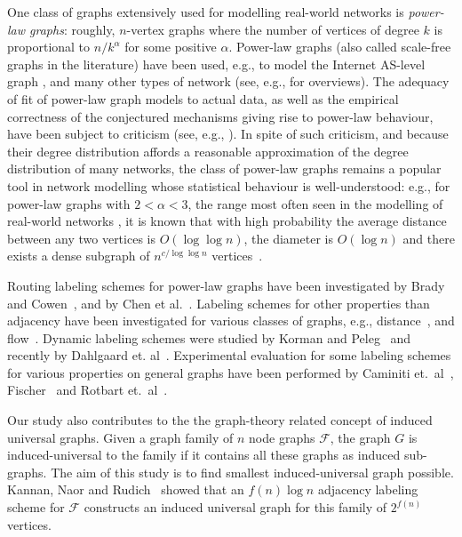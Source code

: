 One class of graphs extensively used for modelling real-world networks is \emph{power-law graphs}: roughly, $n$-vertex graphs where the number of vertices of degree $k$ is proportional to $n/k^{\alpha}$ for some positive $\alpha$. Power-law graphs (also called scale-free graphs in the literature) have been used, e.g., to model the Internet AS-level graph \cite{DBLP:journals/ton/SiganosFFF03,DBLP:conf/podc/AkellaCKS03}, and many other types of network (see, e.g., \cite{mitzenmacher2004brief,clauset2009power} for overviews). 
The adequacy of fit of power-law graph models to actual data, as well as the empirical correctness of the conjectured mechanisms giving rise to power-law behaviour, have been subject to criticism (see, e.g., \cite{DBLP:journals/jacm/AchlioptasCKM09,clauset2009power}). 
In spite of such criticism, and because their degree distribution affords a reasonable approximation of the degree distribution of many networks, the class of power-law graphs remains a popular tool in network modelling whose statistical behaviour is well-understood: e.g., for power-law graphs with $2<\alpha<3$, the range most often seen in the modelling of real-world networks \cite{clauset2009power}, it is known that with high probability the average distance between any two vertices is  $O(\log \log n)$, the diameter is $O(\log n)$ and there exists a dense subgraph of $n^{c/\log \log n}$ vertices~\cite{chung2004average}. 

Routing labeling schemes for power-law graphs  have been investigated by Brady and Cowen~\cite{brady2006compact}, and by Chen et al.~\cite{chen2012compact}. Labeling schemes for other properties than adjacency have been investigated for various classes of graphs, e.g., distance~\cite{gavoillea2004distance}, and flow~\cite{katz2004labeling}. 
Dynamic labeling schemes were studied by Korman and Peleg~\cite{korman2007compact,Korman07,korman2007general} and recently by Dahlgaard et. al~\cite{dahlgaard2014dynamic}.
Experimental evaluation for some labeling schemes for various properties on general graphs have been performed by Caminiti et.~al~\cite{caminiti2008engineering}, Fischer~\cite{fischer2009short} and Rotbart et.~al~\cite{rotbart2014evaluation}.

Our study also contributes to the   the graph-theory related concept of induced universal graphs. 
Given a  graph family of $n$ node graphs  $\mathcal{F}$, the graph $G$ is  induced-universal to the family if it contains all these graphs as induced sub-graphs.
The aim of this study is  to find smallest induced-universal graph possible.
Kannan, Naor and Rudich~\cite{Kannan92} showed that an $f(n) \log n$ adjacency labeling scheme for $\mathcal{F}$  constructs an induced universal graph for this family of  $2^{f(n)}$ vertices. 

